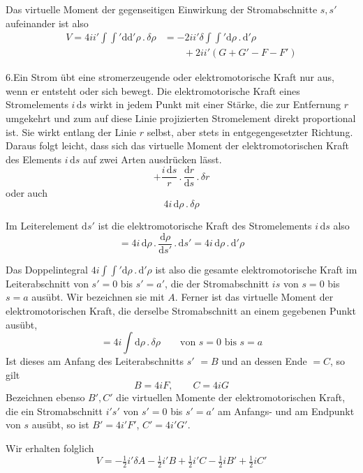 Das virtuelle Moment der gegenseitigen Einwirkung der Stromabschnitte $s,s'$ aufeinander ist also
\[
\begin{aligned}
V=4ii'\int\int'\mathrm d\mathrm d'\rho\,.\,\delta\rho&=-2ii'\delta\int\int'\mathrm d\rho\,.\,\mathrm d'\rho\\
&\qquad+2ii'(G+G'-F-F')
\end{aligned}
\]

6.\quad Ein Strom übt eine stromerzeugende oder elektromotorische Kraft nur aus, wenn er entsteht oder sich bewegt. Die elektromotorische Kraft eines Stromelements $i\,\mathrm ds$ wirkt in jedem Punkt mit einer Stärke, die zur Entfernung $r$ umgekehrt und zum auf diese Linie projizierten Stromelement direkt proportional ist. Sie wirkt entlang der Linie $r$ selbst, aber stets in entgegengesetzter Richtung. Daraus folgt leicht, dass sich das virtuelle Moment der elektromotorischen Kraft des Elements $i\,\mathrm ds$ auf zwei Arten ausdrücken lässt.
\[
+\frac{i\,\mathrm ds}{r}\,.\,\frac{\mathrm dr}{\mathrm ds}\,.\,\delta r
\]
oder auch
\[
4i\,\mathrm d\rho\,.\,\delta\rho
\]

Im Leiterelement $\mathrm ds'$ ist die elektromotorische Kraft des Stromelements $i\,\mathrm ds$ also
\[
=4i\,\mathrm d\rho\,.\,\frac{\mathrm d\rho}{\mathrm ds'}\,.\,\mathrm ds'=4i\,\mathrm d\rho\,.\,\mathrm d'\rho
\]

Das Doppelintegral $4i\int\int'\mathrm d\rho\,.\,\mathrm d'\rho$ ist also die gesamte elektromotorische Kraft im Leiterabschnitt von $s'=0$ bis $s'=a'$, die der Stromabschnitt $is$ von $s=0$ bis $s=a$ ausübt. Wir bezeichnen sie mit $A$. Ferner ist das virtuelle Moment der elektromotorischen Kraft, die derselbe Stromabschnitt an einem gegebenen Punkt ausübt,
\[
=4i\int\mathrm d\rho\,.\,\delta\rho\qquad\text{von }s=0\text{ bis }s=a
\]
Ist dieses am Anfang des Leiterabschnitts $s'$ $=B$ und an dessen Ende $=C$, so gilt
\[
B=4iF,\qquad C=4iG
\]
Bezeichnen ebenso $B',C'$ die virtuellen Momente der elektromotorischen Kraft, die ein Stromabschnitt $i's'$ von $s'=0$ bis $s'=a'$ am Anfangs- und am Endpunkt von $s$ ausübt, so ist $B'=4i'F'$, $C'=4i'G'$.

Wir erhalten folglich
\[
V=-\tfrac{1}{2}i'\delta A-\tfrac{1}{2}i'B+\tfrac{1}{2}i'C-\tfrac{1}{2}iB'+\tfrac{1}{2}iC'
\]

